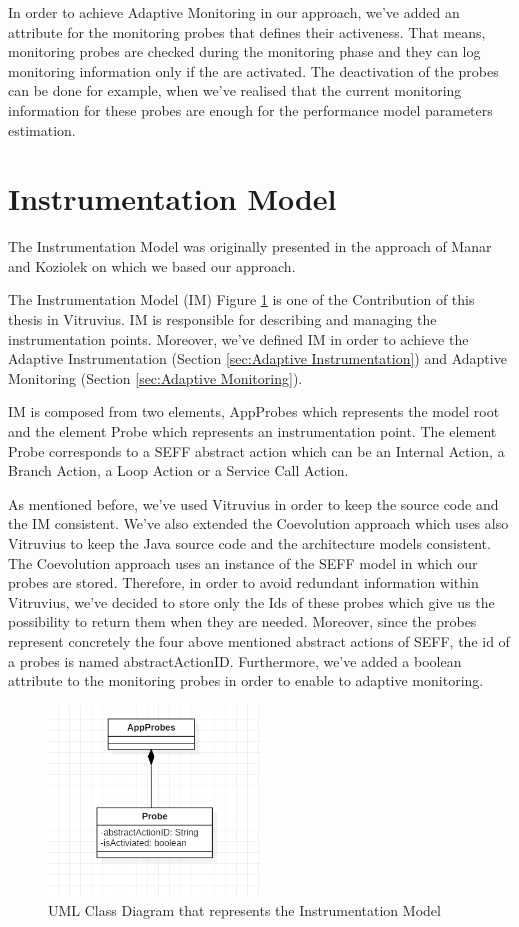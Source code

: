 In order to achieve Adaptive Monitoring in our approach, we've added an attribute for the monitoring probes that defines their activeness. That means, monitoring probes are checked during the monitoring phase and they can log monitoring information only if the are activated. The deactivation of the probes can be done for example, when we've realised that the current monitoring information for these probes are enough for the performance model parameters estimation.

\section{Instrumentation Model}
\label{sec:Instrumentation Model}
The Instrumentation Model was originally presented in the approach of Manar and Koziolek \cite{mazkatli2018continuous} on which we based our approach. 

The Instrumentation Model (IM) Figure \ref{fig:im} is one of the Contribution of this thesis in Vitruvius. IM is responsible for describing and managing the instrumentation points. Moreover, we've defined IM in order to achieve the Adaptive Instrumentation (Section \ref{sec:Adaptive Instrumentation}) and Adaptive Monitoring (Section \ref{sec:Adaptive Monitoring}).

IM is composed from two elements, AppProbes which represents the model root and the element Probe which represents an instrumentation point. The element Probe corresponds to a SEFF abstract action which can be an Internal Action, a Branch Action, a Loop Action or a Service Call Action.

As mentioned before, we’ve used Vitruvius in order to keep the source code and the IM consistent. We've also extended the Coevolution approach which uses also Vitruvius to keep the Java source code and the architecture models consistent. The Coevolution approach uses an instance of the SEFF model in which our probes are stored. Therefore, in order to avoid redundant information within Vitruvius, we've decided to store only the Ids of these probes which give us the possibility to return them when they are needed. Moreover, since the probes represent concretely the four above mentioned abstract actions of SEFF, the id of a probes is named abstractActionID. Furthermore, we've added a boolean attribute to the monitoring probes in order to enable to adaptive monitoring. 

\begin{figure}[h]
\centering
\includegraphics[width=0.5\textwidth]{figures/im}
\caption{UML Class Diagram that represents the Instrumentation Model}
\label{fig:im}
\end{figure}


